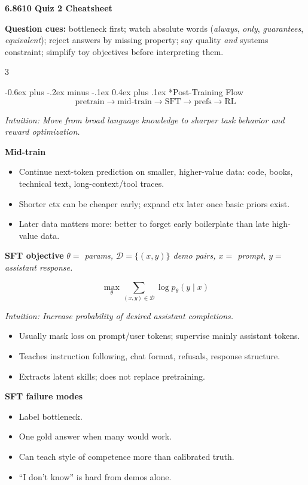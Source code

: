 \documentclass[10pt,landscape]{article}
\makeatletter
\renewcommand{\section}{\@startsection{section}{1}{0mm}%
  {-0.6ex plus -.2ex minus -.1ex}%
  {0.4ex plus .1ex}%
  {\normalfont\normalsize\bfseries}}
\newcommand{\head}[1]{\section*{#1}}
\newcommand{\mini}[1]{\textbf{#1}}
\newcommand{\defs}[1]{{\emph{#1}}\par}
\newcommand{\intuition}[1]{{\scriptsize\emph{Intuition: #1}\par}}
\makeatother
\begin{document}
\raggedright
\footnotesize

\begin{center}
\textbf{6.8610 Quiz 2 Cheatsheet}
\end{center}

\mini{Question cues:} bottleneck first; watch absolute words (\emph{always}, \emph{only}, \emph{guarantees}, \emph{equivalent}); reject answers by missing property; say quality \emph{and} systems constraint; simplify toy objectives before interpreting them.

\begin{multicols}{3}

\head{Post-Training Flow}
\[
\text{pretrain}
\rightarrow
\text{mid-train}
\rightarrow
\text{SFT}
\rightarrow
\text{prefs}
\rightarrow
\text{RL}
\]
\intuition{Move from broad language knowledge to sharper task behavior and reward optimization.}

\mini{Mid-train}
\begin{itemize}
\item Continue next-token prediction on smaller, higher-value data: code, books, technical text, long-context/tool traces.
\item Shorter ctx can be cheaper early; expand ctx later once basic priors exist.
\item Later data matters more: better to forget early boilerplate than late high-value data.
\end{itemize}

\mini{SFT objective}
\defs{\(\theta=\) params,\; \(\mathcal D=\{(x,y)\}\) demo pairs,\; \(x=\) prompt,\; \(y=\) assistant response.}
\[
\max_\theta \sum_{(x,y)\in\mathcal D}\log p_\theta(y\mid x)
\]
\intuition{Increase probability of desired assistant completions.}
\begin{itemize}
\item Usually mask loss on prompt/user tokens; supervise mainly assistant tokens.
\item Teaches instruction following, chat format, refusals, response structure.
\item Extracts latent skills; does not replace pretraining.
\end{itemize}

\mini{SFT failure modes}
\begin{itemize}
\item Label bottleneck.
\item One gold answer when many would work.
\item Can teach style of competence more than calibrated truth.
\item ``I don't know'' is hard from demos alone.
\end{itemize}


\end{multicols}
\end{document}
